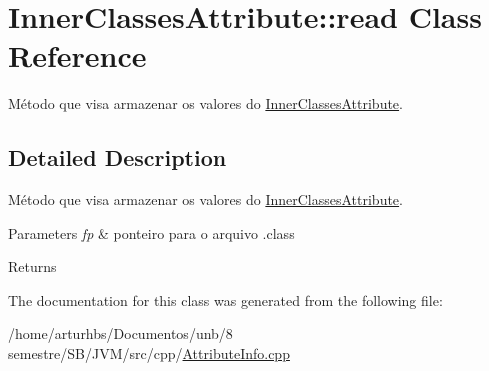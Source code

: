 \hypertarget{classInnerClassesAttribute_1_1read}{}\section{Inner\+Classes\+Attribute\+:\+:read Class Reference}
\label{classInnerClassesAttribute_1_1read}


Método que visa armazenar os valores do \hyperlink{classInnerClassesAttribute}{Inner\+Classes\+Attribute}.  




\subsection{Detailed Description}
Método que visa armazenar os valores do \hyperlink{classInnerClassesAttribute}{Inner\+Classes\+Attribute}. 


\begin{DoxyParams}{Parameters}
{\em fp} & ponteiro para o arquivo .class \\
\hline
\end{DoxyParams}
\begin{DoxyReturn}{Returns}

\end{DoxyReturn}


The documentation for this class was generated from the following file\+:\begin{DoxyCompactItemize}
\item 
/home/arturhbs/\+Documentos/unb/8 semestre/\+S\+B/\+J\+V\+M/src/cpp/\hyperlink{AttributeInfo_8cpp}{Attribute\+Info.\+cpp}\end{DoxyCompactItemize}
